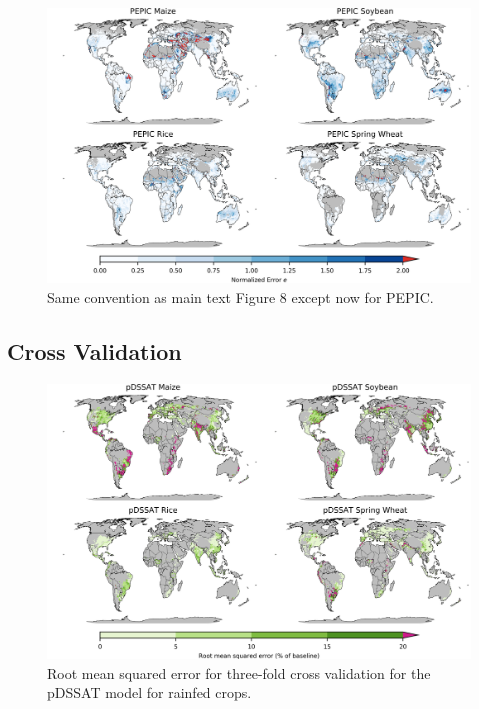 \documentclass[10pt]{article}
\begin{document}
\begin{figure}[h!]
\centering
\includegraphics[width=15.5cm]{PEPIC_spatial_error.png}
\caption{Same convention as main text Figure 8 except now for PEPIC.}
\label{fig:lpjmlnorm}
\end{figure}

\clearpage
\subsection{Cross Validation}

\begin{figure}[h!]
\centering
\includegraphics[width=15.5cm]{pDSSAT_spatial_MSE_ton_ha.png}
\caption{Root mean squared error for three-fold cross validation for the pDSSAT model for rainfed crops.}
\label{fig:pdssatrmse}
\end{figure}
\end{document}
